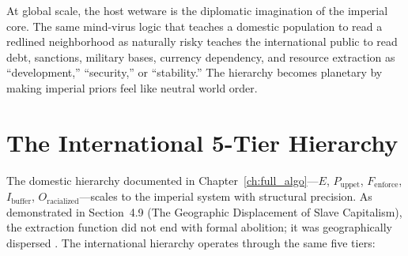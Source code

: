 At global scale, the host wetware is the diplomatic imagination of the imperial core. The same mind-virus logic that teaches a domestic population to read a redlined neighborhood as naturally risky teaches the international public to read debt, sanctions, military bases, currency dependency, and resource extraction as ``development,'' ``security,'' or ``stability.'' The hierarchy becomes planetary by making imperial priors feel like neutral world order.

\section{The International 5-Tier Hierarchy}

The domestic hierarchy documented in Chapter~\ref{ch:full_algo}---$E$, $P_{\text{uppet}}$, $F_{\text{enforce}}$, $I_{\text{buffer}}$, $O_{\text{racialized}}$---scales to the imperial system with structural precision. As demonstrated in Section~4.9 (The Geographic Displacement of Slave Capitalism), the extraction function did not end with formal abolition; it was geographically dispersed \cite{rodney, pigeaud}. The international hierarchy operates through the same five tiers:

